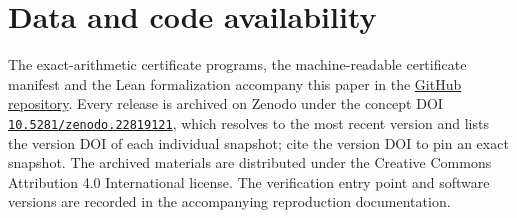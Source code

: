 \documentclass[11pt]{article}
\theoremstyle{definition}
\theoremstyle{remark}
\theoremstyle{plain}
\begin{document}
\section*{Data and code availability}

The exact-arithmetic certificate programs, the machine-readable certificate
manifest and the Lean formalization accompany this paper in the
\href{https://github.com/raelnogpires/rigidity-of-fourier-multipliers-for-universal-euler-convective-cancellations}{GitHub repository}.
Every release is archived on Zenodo under the concept DOI
\href{https://doi.org/10.5281/zenodo.22819121}{\texttt{10.5281/zenodo.22819121}},
which resolves to the most recent version and lists the version DOI of each
individual snapshot; cite the version DOI to pin an exact snapshot. The
archived materials are distributed under the Creative Commons Attribution 4.0
International license.
The verification entry point and software versions are recorded in the
accompanying reproduction documentation.



\end{document}
